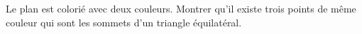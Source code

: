 Le plan est colorié avec deux couleurs. Montrer qu'il existe trois points de même couleur qui sont les sommets d'un triangle équilatéral.
